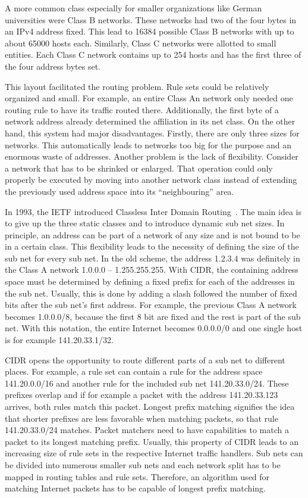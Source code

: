 \documentclass[a4paper,
		12pt,
		parskip=full,
		titlepage
		]{scrartcl}
\begin{document}
A more common class especially for smaller organizations like German universities were Class B networks.
These networks had two of the four bytes in an IPv4 address fixed.
This lead to 16384 possible Class B networks with up to about 65000 hosts each.
Similarly, Class C networks were allotted to small entities.
Each Class C network contains up to 254 hosts and has the first three of the four address bytes set.

This layout facilitated the routing problem.
Rule sets could be relatively organized and small.
For example, an entire Class An network only needed one routing rule to have its traffic routed there.
Additionally, the first byte of a network address already determined the affiliation in its net class.
On the other hand, this system had major disadvantages.
Firstly, there are only three sizes for networks.
This automatically leads to networks too big for the purpose and an enormous waste of addresses.
Another problem is the lack of flexibility.
Consider a network that has to be shrinked or enlarged.
That operation could only properly be executed by moving into another network class instead of extending the 
previously used address space into its \enquote{neighbouring} area.

In 1993, the IETF introduced Classless Inter Domain Routing~\cite{rfc1518, rfc4632}.
The main idea is to give up the three static classes and to introduce dynamic sub net sizes.
In principle, an address can be part of a network of any size and is not bound to be in a certain class.
This flexibility leads to the necessity of defining the size of the sub net for every sub net.
In the old scheme, the address 1.2.3.4 was definitely in the Class A network 1.0.0.0 -- 1.255.255.255.
With CIDR, the containing address space must be determined by defining a fixed prefix for each of the addresses in the sub net.
Usually, this is done by adding a slash followed the number of fixed bits after the sub net's first address.
For example, the previous Class A network becomes 1.0.0.0/8, because the first 8 bit are fixed and the rest is part of the sub net.
With this notation, the entire Internet becomes 0.0.0.0/0 and one single host is for example 141.20.33.1/32.

CIDR opens the opportunity to route different parts of a sub net to different places.
For example, a rule set can contain a rule for the address space 141.20.0.0/16 and another rule for the included sub net 141.20.33.0/24.
These prefixes overlap and if for example a packet with the address 141.20.33.123 arrives, both rules match this packet.
Longest prefix matching signifies the idea that shorter prefixes are less favorable when matching packets, so that rule 141.20.33.0/24 matches.
Packet matchers need to have capabilities to match a packet to its longest matching prefix.
Usually, this property of CIDR leads to an increasing size of rule sets in the respective Internet traffic handlers. %
Sub nets can be divided into numerous smaller sub nets and each network split has to be mapped in routing tables and rule sets.
Therefore, an algorithm used for matching Internet packets has to be capable of longest prefix matching.
\end{document}
